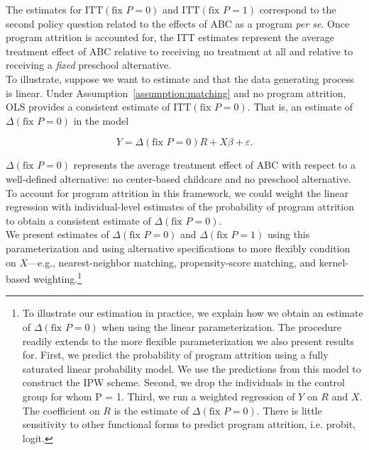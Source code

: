 \noindent The estimates for $\text{ITT} \left( \text{fix } P = 0 \right) $ and $\text{ITT} \left( \text{fix } P = 1 \right)$ correspond to the second policy question related to the effects of ABC as a program \emph{per se}. Once program attrition is accounted for, the ITT estimates represent the average treatment effect of ABC relative to receiving no treatment at all and relative to receiving a \textit{fixed} preschool alternative.\\

\noindent To illustrate, suppose we want to estimate and that the data generating process is linear. Under Assumption~\ref{assumption:matching} and no program attrition, OLS provides a consistent estimate of $\text{ITT} \left( \text{fix } P = 0 \right)$. That is, an estimate of $\Delta \left( \text{fix } P = 0 \right)$ in the model

\begin{equation}
Y = \Delta \left( \text{fix } P = 0 \right) R + X \beta + \varepsilon. \label{eq:ittmodel}
\end{equation}

\noindent $\Delta \left( \text{fix } P = 0 \right)$ represents the average treatment effect of ABC with respect to a well-defined alternative: no center-based childcare and no preschool alternative. To account for program attrition in this framework, we could weight the linear regression with individual-level estimates of the probability of program attrition to obtain a consistent estimate of $\Delta \left( \text{fix } P = 0 \right)$.\\

\noindent We present estimates of $\Delta \left( \text{fix } P = 0 \right)$ and $\Delta \left( \text{fix } P = 1 \right)$ using this parameterization and using alternative specifications to more flexibly condition on $X$---e.g., nearest-neighbor matching, propensity-score matching, and kernel-based weighting.\footnote{To illustrate our estimation in practice, we explain how we obtain an estimate of $\Delta \left( \text{fix } P = 0 \right)$ when using the linear parameterization. The procedure readily extends to the more flexible parameterization we also present results for. First, we predict the probability of program attrition using a fully saturated linear probability model. We use the predictions from this model to construct the IPW scheme. Second, we drop the individuals in the control group for whom P = 1. Third, we run a weighted regression of $Y$ on $R$ and $X$. The coefficient on $ R $ is the estimate of $\Delta \left( \text{fix } P = 0 \right)$. There is little sensitivity to other functional forms to predict program attrition, i.e. probit, logit.}

